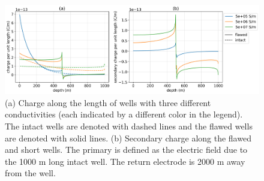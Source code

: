 \begin{figure}
    \begin{center}
    \includegraphics[width=\textwidth]{figures/dc_casing/casing_charge_sigma_casing.png}
    \end{center}
\caption{
    (a) Charge along the length of wells with three different
    conductivities (each indicated by a different color in the legend).
    The intact wells are denoted with dashed lines and the flawed wells
    are denoted with solid lines.
    (b) Secondary charge along the flawed and short wells. The primary is
    defined as the electric field due to the 1000 m long intact well. The return electrode
    is 2000 m away from the well.
}
\label{fig:casing_charge_sigma_casing}
\end{figure}
